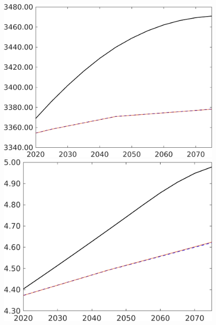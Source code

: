 \begin{figure}[h!!]
\begin{minipage}[]{0.32\textwidth}
\end{minipage}
	\begin{minipage}[]{0.32\textwidth}
	\includegraphics[width=1\textwidth]{../../codding_model/own_basedOnFried/optimalPol_elastS_DisuSci/figures/all_1705/Af_CompEffOPT_T_NoTaus_spillover0_sep1_BN0_ineq0_etaa0.79_lgd0.png}
\end{minipage}
\begin{minipage}[]{0.32\textwidth}
	\includegraphics[width=1\textwidth]{../../codding_model/own_basedOnFried/optimalPol_elastS_DisuSci/figures/all_1705/An_CompEffOPT_T_NoTaus_spillover0_sep1_BN0_ineq0_etaa0.79_lgd0.png}

\end{minipage}
\end{figure}
